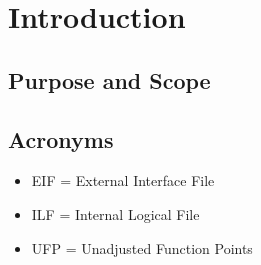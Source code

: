 \section{Introduction}

\subsection{Purpose and Scope}

\subsection{Acronyms}
\begin{itemize}
    \item EIF = External Interface File
    \item ILF = Internal Logical File
    \item UFP = Unadjusted Function Points
\end{itemize}

